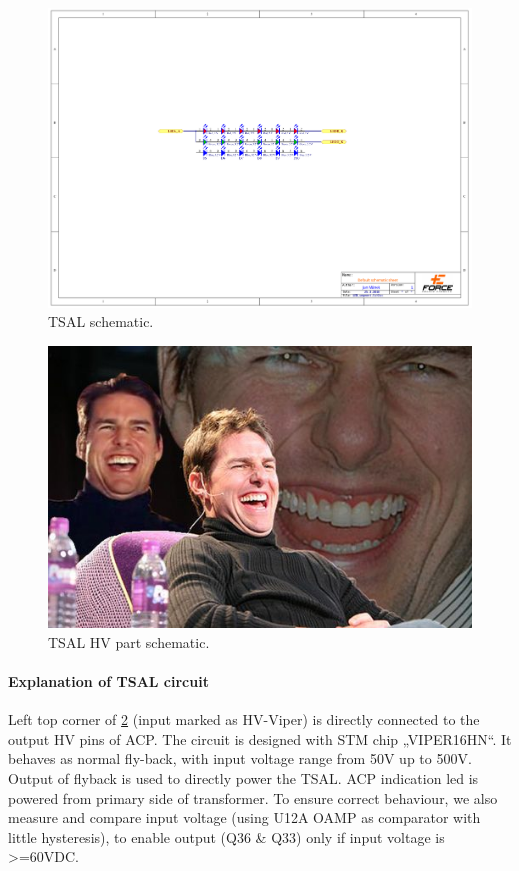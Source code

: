 \begin{figure}[H]
	\centering
	\includegraphics[width=\textwidth,trim={6cm 10cm 6cm 7cm},clip]{./img/TSAL-schematic.pdf}
	\caption{TSAL schematic.}
	\label{fig:TSAL-schematic}
\end{figure}

\begin{figure}[H]
	\centering
	\includegraphics[width=\textwidth]{./img/tsal-hv.jpg}
	\caption{TSAL HV part schematic.}
	\label{fig:TSAL-HV}
\end{figure}

\paragraph{Explanation of TSAL circuit}

Left top corner of \ref{fig:TSAL-HV} (input marked as HV-Viper) is directly connected to the output HV pins of ACP. The circuit is designed with STM chip „VIPER16HN“. It behaves as normal fly-back, with input voltage range from 50V up to 500V. Output of flyback is used to directly power the TSAL. ACP indication led is powered from primary side of transformer. To ensure correct behaviour, we also measure and compare input voltage (using U12A OAMP as comparator with little hysteresis), to enable output (Q36 \& Q33) only if input voltage is >=60VDC.

